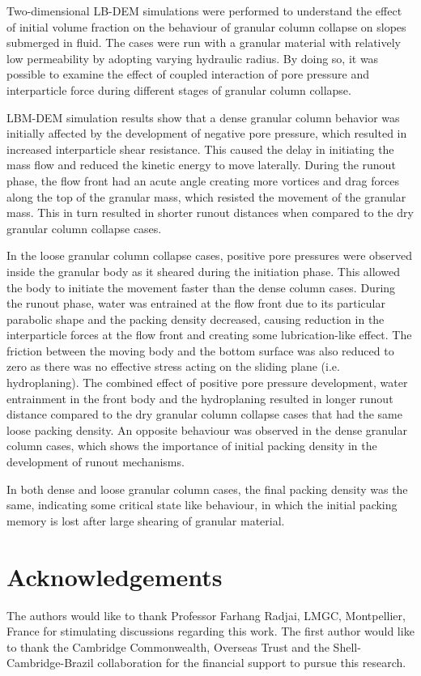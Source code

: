 \documentclass[12pt,twoside]{tuhhproc-en}
\begin{document}
Two-dimensional LB-DEM simulations were performed to understand the effect of initial volume fraction on the behaviour of granular column collapse on slopes submerged in fluid. The cases were run with a granular material with relatively low permeability by adopting varying hydraulic radius. By doing so, it was possible to examine the effect of coupled interaction of pore pressure and interparticle force during different stages of granular column collapse.

LBM-DEM simulation results show that a dense granular column behavior was initially affected by the development of negative pore pressure, which resulted in increased interparticle shear resistance. This caused the delay in initiating the mass flow and reduced the kinetic energy to move laterally. During the runout phase, the flow front had an acute angle creating more vortices and drag forces along the top of the granular mass, which resisted the movement of the granular mass. This in turn resulted in shorter runout distances when compared to the dry granular column collapse cases.  

In the loose granular column collapse cases, positive pore pressures were observed inside the granular body as it sheared during the initiation phase. This allowed the body to initiate the movement faster than the dense column cases. During the runout phase, water was entrained at the flow front due to its particular parabolic shape and the packing density decreased, causing reduction in the interparticle forces at the flow front and creating some lubrication-like effect. The friction between the moving body and the bottom surface was also reduced to zero as there was no effective stress acting on the sliding plane (i.e. hydroplaning). The combined effect of positive pore pressure development, water entrainment in the front body and the hydroplaning resulted in longer runout distance compared to the dry granular column collapse cases that had the same loose packing density. An opposite behaviour was observed in the dense granular column cases, which shows the importance of initial packing density in the development of runout mechanisms.

In both dense and loose granular column cases, the final packing density was the same, indicating some critical state like behaviour, in which the initial packing memory is lost after large shearing of granular material.

\section{Acknowledgements}
The authors would like to thank Professor Farhang Radjai, LMGC, Montpellier, France for stimulating discussions regarding this work. The first author would like to thank the Cambridge Commonwealth, Overseas Trust and the Shell-Cambridge-Brazil collaboration for the financial support to pursue this research.
\end{document}
